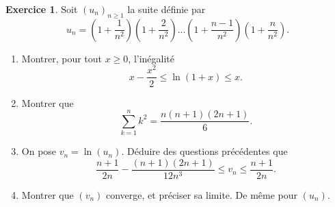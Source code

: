 \documentclass[a4paper, 11pt,openany]{article}%
\theoremstyle{plain}
\theoremstyle{definition}
\newtheorem{exo}{Exercice}
\theoremstyle{remark}
\begin{document}
  
\begin{exo}
Soit $(u_n)_{n \geqslant 1}$ la suite définie par 
\[ u_n = \left(1+\frac{1}{n^2} \right) \left( 1+\frac{2}{n^2} \right) ... \left(1+\frac{n-1}{n^2} \right)\left(1+\frac{n}{n^2} \right).\]
\begin{enumerate}
\item Montrer, pour tout $x \geqslant 0$, l'inégalité
\[  x - \frac{x^2}{2} \leqslant \ln(1+x) \leqslant x.\]
\item Montrer que
\[ \sum_{k=1}^n k^2 = \frac{n(n+1)(2n+1)}{6}.\]
\item On pose $v_n=\ln(u_n)$. Déduire des questions précédentes que 
\[ \frac{n+1}{2n}- \frac{(n+1)(2n+1)}{12n^3} \leqslant v_n \leqslant \frac{n+1}{2n}.\]
\item Montrer que $(v_n)$ converge, et préciser sa limite. De même pour $(u_n)$.
\end{enumerate}
\end{exo}
\end{document}
